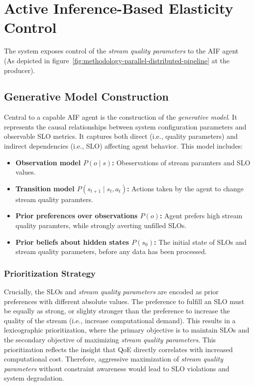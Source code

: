 \section{Active Inference-Based Elasticity Control}

The system exposes control of the \textit{stream quality parameters} to the AIF agent (As depicted in figure~\ref{fig:methodology-parallel-distributed-pipeline} at the producer). 

\subsection{Generative Model Construction}
Central to a capable AIF agent is the construction of the \textit{generative model}. It represents the causal relationships between system configuration parameters and observable SLO metrics. It captures both direct (i.e., quality parameters) and indirect dependencies (i.e., SLO) affecting agent behavior. This model includes:
\begin{itemize}
  \item \textbf{Observation model \(P(o \mid s)\):} Obeservations of stream paramters and SLO values.
  \item \textbf{Transition model \(P(s_{t+1} \mid s_t,a_t)\):} Actions taken by the agent to change stream quality paramters.
  \item \textbf{Prior preferences over observations \(P(o)\):} Agent prefers high stream quality paramters, while strongly averting unfilled SLOs.
  \item \textbf{Prior beliefs about hidden states \(P(s_0)\):} The initial state of SLOs and stream quality parameters, before any data has been processed.
\end{itemize}

\subsubsection{Prioritization Strategy}
Crucially, the SLOs and \textit{stream quality parameters} are encoded as prior preferences with different absolute values. The preference to fulfill an SLO must be equally as strong, or slighty stronger than the preference to increase the quality of the stream (i.e., increase computational demand). This results in a lexicographic prioritization, where the primary objective is to maintain SLOs and the secondary objective of maximizing \textit{stream quality parameters}. This prioritization reflects the insight that QoE directly correlates with increased computational cost. Therefore, aggressive maximization of \textit{stream quality parameters} without constraint awareness would lead to SLO violations and system degradation.

